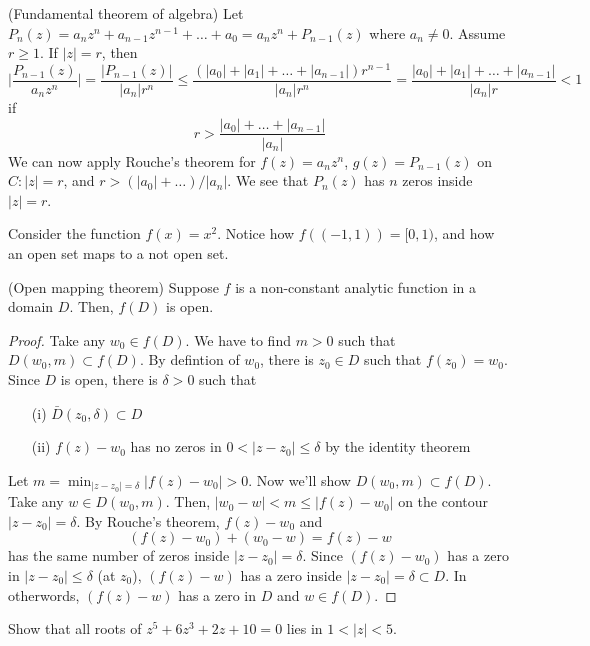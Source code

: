 \vspace{2ex}
\begin{recall}
(Fundamental theorem of algebra) Let $P_{n}(z)=a_{n}z^{n}+a_{n-1}z^{n-1}+\ldots +a_0=a_{n}z^{n}+P_{n-1}(z)$ where $a_{n}\ne 0$. Assume $r\geq 1$. If $|z|=r$, then
\[\Big|\dfrac{P_{n-1}(z)}{a_{n}z^{n}}\Big|=\dfrac{|P_{n-1}(z)|}{|a_{n}|r^{n}}\leq \dfrac{(|a_0|+|a_1|+\ldots +|a_{n-1}|)r^{n-1}}{|a_{n}|r^{n}}=\dfrac{|a_0|+|a_1|+\ldots +|a_{n-1}|}{|a_{n}|r}<1\]
if 
\[r>\dfrac{|a_0|+\ldots +|a_{n-1}|}{|a_{n}|}\]
We can now apply Rouche's theorem for $f(z)=a_{n}z^{n}$, $g(z)=P_{n-1}(z)$ on $C:|z|=r$, and $r>(|a_0|+\ldots )/|a_{n}|$. We see that $P_{n}(z)$ has $n$ zeros inside $|z|=r$.
\end{recall}
\vspace{2ex}
\begin{rmk}
Consider the function $f(x)=x^2$. Notice how $f((-1,1))=[0,1)$, and how an open set maps to a not open set. 
\end{rmk}
\vspace{2ex}
\begin{thm}
(Open mapping theorem) Suppose $f$ is a non-constant analytic function in a domain $D$. Then, $f(D)$ is open. 
\end{thm}
\vspace{2ex}
\begin{proof}
Take any $w_0\in f(D)$. We have to find $m>0$ such that $D(w_0,m)\subset f(D)$. By defintion of $w_0$, there is $z_0\in D$ such that $f(z_0)=w_0$. Since $D$ is open, there is $\delta >0$ such that 
\begin{itemize}
\item[(i)] $\bar{D}(z_0,\delta )\subset D$ \item[(ii)] $f(z)-w_0$ has no zeros in $0<|z-z_0|\leq \delta $ by the identity theorem
\end{itemize}
Let $m=\min _{|z-z_0|=\delta }|f(z)-w_0|>0$. Now we'll show $D(w_0,m)\subset f(D)$. Take any $w\in D(w_0,m)$. Then, $|w_0-w|<m\leq |f(z)-w_0|$ on the contour $|z-z_0|=\delta $. By Rouche's theorem, $f(z)-w_0$ and 
\[(f(z)-w_0)+(w_0-w)=f(z)-w\]
has the same number of zeros inside $|z-z_0|=\delta $. Since $(f(z)-w_0)$ has a zero in $|z-z_0|\leq \delta $ (at $z_0$), $(f(z)-w)$ has a zero inside $|z-z_0|=\delta \subset D$. In otherwords, $(f(z)-w)$ has a zero in $D$ and $w\in f(D)$. 
\end{proof}
\vspace{2ex}
\begin{ex}
Show that all roots of $z^{5}+6z^{3}+2z+10=0$ lies in $1<|z|<5$. 
\end{ex}
